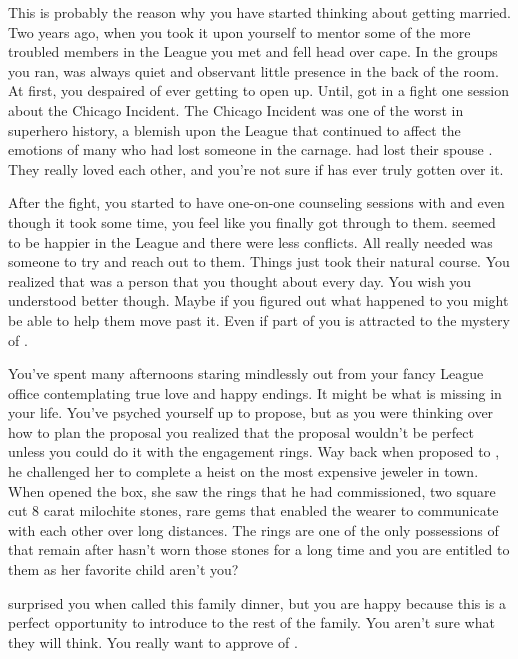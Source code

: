 \documentclass[char]{LRSguildcamp1}
\begin{document}
This is probably the reason why you have started thinking about getting married. Two years ago, when you took it upon yourself to mentor some of the more troubled members in the League you met \cYS{} and fell head over cape. In the groups you ran, \cYS{\they} was always quiet and observant little presence in the back of the room. At first, you despaired of ever getting \cYS{\them} to open up. Until, \cYS{\they} got in a fight one session about the Chicago Incident. The Chicago Incident was one of the worst in superhero history, a blemish upon the League that continued to affect the emotions of many who had lost someone in the carnage. \cArchitect{} had lost their spouse \cAS{\intro}. They really loved each other, and you're not sure if \cArchitect{\they} has ever truly gotten over it. 

After the fight, you started to have one-on-one counseling sessions with \cYS{} and even though it took some time, you feel like you finally got through to them. \cYS{} seemed to be happier in the League and there were less conflicts.  All \cYS{\they} really needed was someone to try and reach out to them. Things just took their natural course. You realized that \cYS{\they} was a person that you thought about every day. You wish you understood \cYS{\them} better though. Maybe if you figured out what happened to \cYS{\them} you might be able to help them move past it.  Even if part of you is attracted to the mystery of \cYS{\them}. 
 
You've spent many afternoons staring mindlessly out from your fancy League office contemplating true love and happy endings. It might be what is missing in your life. You've psyched yourself up to propose, but as you were thinking over how to plan the proposal you realized that the proposal wouldn't be perfect unless you could do it with the engagement rings. Way back when \cGS{\parent} proposed to \cGrandma{\parent}, he challenged her to complete a heist on the most expensive jeweler in town. When \cGrandma{\they} opened the box, she saw the rings that he had commissioned, two square cut 8 carat milochite stones, rare gems that enabled the wearer to communicate with each other over long distances. The rings are one of the only possessions of \cGS{\parent} that remain after \cGS{\their} \cGrandma{\they} hasn't worn those stones for a long time and you are entitled to them as her favorite child aren't you? 

 \cGrandma{\parent} surprised you when \cGrandma{\they} called this family dinner, but you are happy because this is a perfect opportunity to introduce \cYS{} to the rest of the family. You aren't sure what they will think. You really want \cGrandma{\parent} to approve of \cYS{}. 
\end{document}

